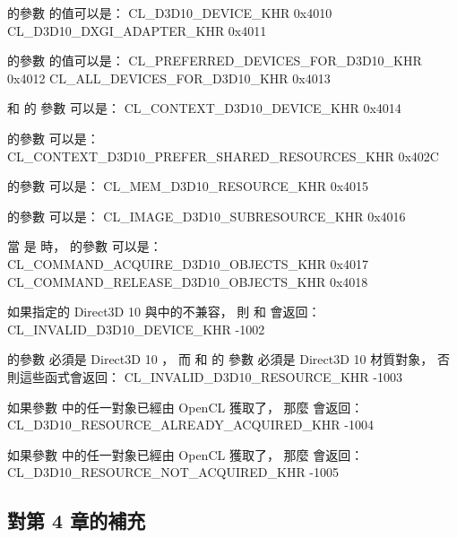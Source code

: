  的參數  的值可以是：
\startclc
CL_D3D10_DEVICE_KHR		0x4010
CL_D3D10_DXGI_ADAPTER_KHR	0x4011
\stopclc

 的參數  的值可以是：
\startclc
CL_PREFERRED_DEVICES_FOR_D3D10_KHR	0x4012
CL_ALL_DEVICES_FOR_D3D10_KHR		0x4013
\stopclc

 和  的
參數  可以是：
\startclc
CL_CONTEXT_D3D10_DEVICE_KHR	0x4014
\stopclc

 的參數  可以是：
\startclc
CL_CONTEXT_D3D10_PREFER_SHARED_RESOURCES_KHR	0x402C
\stopclc

 的參數  可以是：
\startclc
CL_MEM_D3D10_RESOURCE_KHR	0x4015
\stopclc

 的參數  可以是：
\startclc
CL_IMAGE_D3D10_SUBRESOURCE_KHR	0x4016
\stopclc

當  是  時，
  的參數  可以是：
\startclc
CL_COMMAND_ACQUIRE_D3D10_OBJECTS_KHR	0x4017
CL_COMMAND_RELEASE_D3D10_OBJECTS_KHR	0x4018
\stopclc

如果指定的 Direct3D 10 與中的不兼容，
則  和  會返回：
\startclc
CL_INVALID_D3D10_DEVICE_KHR		-1002
\stopclc

 的參數  必須是 Direct3D 10 ，
而  和  的
參數  必須是 Direct3D 10 材質對象，
否則這些函式會返回：
\startclc
CL_INVALID_D3D10_RESOURCE_KHR		-1003
\stopclc

如果參數  中的任一對象已經由 OpenCL 獲取了，
那麼  會返回：
\startclc
CL_D3D10_RESOURCE_ALREADY_ACQUIRED_KHR	-1004
\stopclc

如果參數  中的任一對象已經由 OpenCL 獲取了，
那麼  會返回：
\startclc
CL_D3D10_RESOURCE_NOT_ACQUIRED_KHR	-1005
\stopclc

\subsection{對第 4 章的補充}


